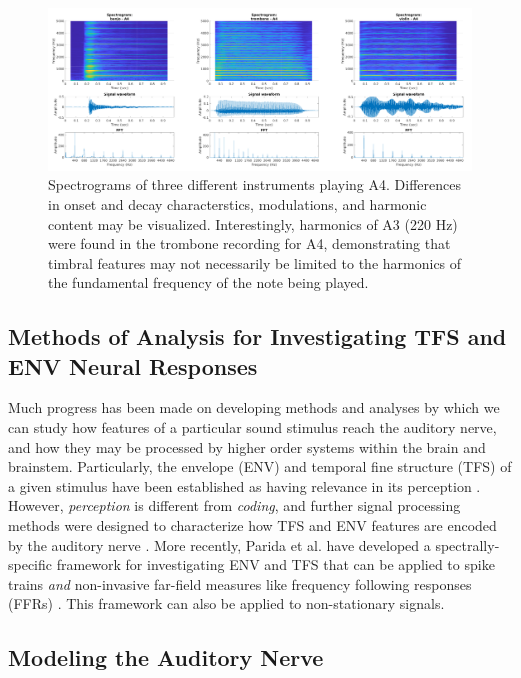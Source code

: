 \documentclass[conference]{IEEEtran}
\begin{document}
\begin{figure}
\includegraphics[width = \textwidth]{spects}
\caption{Spectrograms of three different instruments playing A4. Differences in onset and decay characterstics, modulations, and harmonic content may be visualized. Interestingly, harmonics of A3 (220 Hz) were found in the trombone recording for A4, demonstrating that timbral features may not necessarily be limited to the harmonics of the fundamental frequency of the note being played.}
\label{fig:spects}
\end{figure}


\subsection{Methods of Analysis for Investigating TFS and ENV Neural Responses}
Much progress has been made on developing methods and analyses by which we can study how features of a particular sound stimulus reach the auditory nerve, and how they may be processed by higher order systems within the brain and brainstem. Particularly, the envelope (ENV) and temporal fine structure (TFS) of a given stimulus have been established as having relevance in its perception \cite{smith_chimaeric_2002}. However, \textit{perception }is different from \textit{coding}, and further signal processing methods were designed to characterize how TFS and ENV features are encoded by the auditory nerve \cite{heinz_quantifying_2009}. More recently, Parida et al. have developed a spectrally-specific framework for investigating ENV and TFS that can be applied to spike trains \textit{and} non-invasive far-field measures like frequency following responses (FFRs) \cite{parida_spectrally_2020}. This framework can also be applied to non-stationary signals. 

\subsection{Modeling the Auditory Nerve} 
\end{document}
